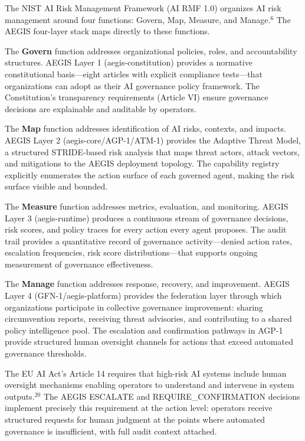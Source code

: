 \documentclass{IEEEcsmag}
\begin{document}
The NIST AI Risk Management Framework (AI RMF 1.0) organizes AI risk management around four functions: Govern, Map, Measure, and Manage.$^{6}$ The AEGIS four-layer stack maps directly to these functions.

The {\bf Govern} function addresses organizational policies, roles, and accountability structures. AEGIS Layer 1 (aegis-constitution) provides a normative constitutional basis---eight articles with explicit compliance tests---that organizations can adopt as their AI governance policy framework. The Constitution's transparency requirements (Article VI) ensure governance decisions are explainable and auditable by operators.

The {\bf Map} function addresses identification of AI risks, contexts, and impacts. AEGIS Layer 2 (aegis-core/AGP-1/ATM-1) provides the Adaptive Threat Model, a structured STRIDE-based risk analysis that maps threat actors, attack vectors, and mitigations to the AEGIS deployment topology. The capability registry explicitly enumerates the action surface of each governed agent, making the risk surface visible and bounded.

The {\bf Measure} function addresses metrics, evaluation, and monitoring. AEGIS Layer 3 (aegis-runtime) produces a continuous stream of governance decisions, risk scores, and policy traces for every action every agent proposes. The audit trail provides a quantitative record of governance activity---denied action rates, escalation frequencies, risk score distributions---that supports ongoing measurement of governance effectiveness.

The {\bf Manage} function addresses response, recovery, and improvement. AEGIS Layer 4 (GFN-1/aegis-platform) provides the federation layer through which organizations participate in collective governance improvement: sharing circumvention reports, receiving threat advisories, and contributing to a shared policy intelligence pool. The escalation and confirmation pathways in AGP-1 provide structured human oversight channels for actions that exceed automated governance thresholds.

The EU AI Act's Article 14 requires that high-risk AI systems include human oversight mechanisms enabling operators to understand and intervene in system outputs.$^{20}$ The AEGIS ESCALATE and REQUIRE\_CONFIRMATION decisions implement precisely this requirement at the action level: operators receive structured requests for human judgment at the points where automated governance is insufficient, with full audit context attached.
\end{document}
